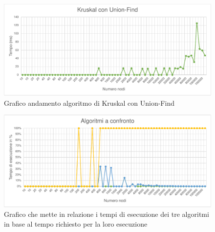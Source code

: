 \documentclass[a4paper]{article}
\begin{document}
\begin{figure}[H]
\centering
\includegraphics[scale=1]{grafici/kruskaluf.pdf}
\caption{Grafico andamento algoritmo di Kruskal con Union-Find}
\end{figure}

\begin{figure}[H]
\centering
\includegraphics[scale=1]{grafici/confronto.pdf}
\caption{Grafico che mette in relazione i tempi di esecuzione dei tre algoritmi in base al tempo richiesto per la loro esecuzione}
\end{figure}
\end{document}
